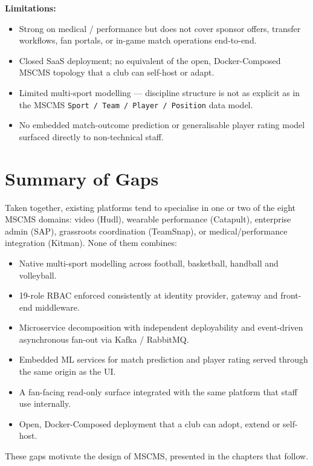 \documentclass[12pt,a4paper,oneside]{report}
\begin{document}
\textbf{Limitations:}
\begin{itemize}[leftmargin=*]
  \item Strong on medical / performance but does not cover sponsor
        offers, transfer workflows, fan portals, or in-game match
        operations end-to-end.
  \item Closed SaaS deployment; no equivalent of the open,
        Docker-Composed MSCMS topology that a club can self-host or
        adapt.
  \item Limited multi-sport modelling --- discipline structure is not
        as explicit as in the MSCMS \texttt{Sport / Team / Player /
        Position} data model.
  \item No embedded match-outcome prediction or generalisable player
        rating model surfaced directly to non-technical staff.
\end{itemize}

\section{Summary of Gaps}
\label{sec:prevwork-gaps}
Taken together, existing platforms tend to specialise in one or two of
the eight MSCMS domains: video (Hudl), wearable performance
(Catapult), enterprise admin (SAP), grassroots coordination
(TeamSnap), or medical/performance integration (Kitman). None of them
combines:
\begin{itemize}[leftmargin=*]
  \item Native multi-sport modelling across football, basketball,
        handball and volleyball.
  \item 19-role RBAC enforced consistently at identity provider,
        gateway and front-end middleware.
  \item Microservice decomposition with independent deployability and
        event-driven asynchronous fan-out via Kafka / RabbitMQ.
  \item Embedded ML services for match prediction and player rating
        served through the same origin as the UI.
  \item A fan-facing read-only surface integrated with the same
        platform that staff use internally.
  \item Open, Docker-Composed deployment that a club can adopt,
        extend or self-host.
\end{itemize}
These gaps motivate the design of MSCMS, presented in the chapters
that follow.
\fi

\end{document}
